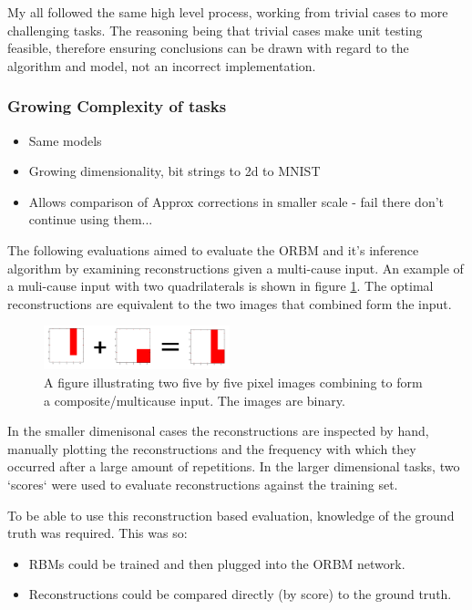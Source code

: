 My  all followed the same high level process, working from trivial cases to more challenging tasks. The reasoning being that trivial cases make unit testing feasible, therefore ensuring conclusions can be drawn with regard to the algorithm and model, not an incorrect implementation.

\subsubsection{Growing Complexity of tasks}

\begin{itemize}
  \item Same models
  \item Growing dimensionality, bit strings to 2d to MNIST
  \item Allows comparison of Approx corrections in smaller scale - fail there don't continue using them...
\end{itemize}

The following evaluations aimed to evaluate the ORBM and it's inference algorithm by examining reconstructions given a multi-cause input. An example of a muli-cause input with two quadrilaterals is shown in figure \ref{F:Composite-Example}. The optimal reconstructions are equivalent to the two images that combined form the input.

\begin{figure}
  \begin{center}
    \includegraphics[width=0.48\textwidth]{Assets/Composite-Example.png}
  \end{center}
  \caption{A figure illustrating two five by five pixel images combining to form a composite/multicause input. The images are binary.}
  \label{F:Composite-Example}
\end{figure}

In the smaller dimenisonal cases the reconstructions are inspected by hand, manually plotting the reconstructions and the frequency with which they occurred after a large amount of repetitions. In the larger dimensional tasks, two `scores` were used to evaluate reconstructions against the training set.

To be able to use this reconstruction based evaluation, knowledge of the ground truth was required. This was so:
\begin{itemize}
  \item RBMs could be trained and then plugged into the ORBM network.
  \item Reconstructions could be compared directly (by score) to the ground truth.
\end{itemize}


